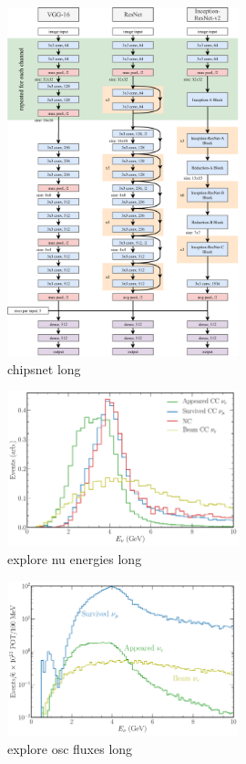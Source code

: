 \begin{figure} %
    \includegraphics[width=0.6\textwidth]{diagrams/7-cvn/chipsnet.pdf}
    \caption[chipsnet short]
    {chipsnet long}
    \label{fig:chipsnet}
\end{figure}

\begin{figure} %
    \includegraphics[width=0.6\textwidth]{diagrams/7-cvn/chipsnet/explore_nu_energies.pdf}
    \caption[explore nu energies short]
    {explore nu energies long}
    \label{fig:explore_nu_energies}
\end{figure}

\begin{figure} %
    \includegraphics[width=0.6\textwidth]{diagrams/7-cvn/chipsnet/explore_osc_fluxes.pdf}
    \caption[explore osc fluxes short]
    {explore osc fluxes long}
    \label{fig:explore_osc_fluxes}
\end{figure}

